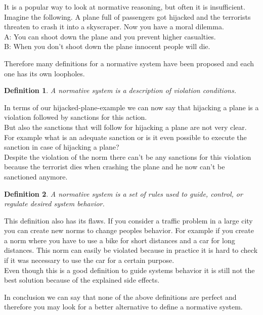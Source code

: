 \documentclass[conference]{hehe}
\newtheorem{definition}{Definition}
\begin{document}
It is a popular way to look at normative reasoning, but often it is insufficient. Imagine the following. A plane full of passengers got hijacked and the terrorists threaten to crash it into a skyscraper. Now you have a moral dilemma.\\
A: You can shoot down the plane and you prevent higher casualties.\\
B: When you don't shoot down the plane innocent people will die.

Therefore many definitions for a normative system have been proposed and each one has its own loopholes.


\begin{definition}
A normative system is a description
of violation conditions. \cite{b2}\\
\end{definition}

In terms of our hijacked-plane-example we can now say that hijacking a plane is a violation followed by sanctions for this action.\\
But also the sanctions that will follow for hijacking a plane are not very clear. For example what is an adequate sanction or is it even possible to execute the sanction in case of hijacking a plane?\\
Despite the violation of the norm there can't be any sanctions for this violation because the terrorist dies when crashing the plane and he now can't be sanctioned anymore.\\

\begin{definition}
A normative system is a set of rules used to guide,
control, or regulate desired system behavior.\cite{b2}\\
\end{definition}

This definition also has its flaws. If you consider a traffic problem in a large city you can create new norms to change peoples behavior. For example if you create a norm where you have to use a bike for short distances and a car for long distances. This norm can easily be violated because in practice it is hard to check if it was necessary to use the car for a certain purpose.\\
Even though this is a good definition to guide systems behavior it is still not the best solution because of the explained side effects.

In conclusion we can say that none of the above definitions are perfect and therefore you may look for a better alternative to define a normative system.
\end{document}
